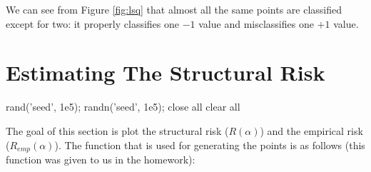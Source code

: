 \documentclass[11pt, twoside]{article}   	%
\newenvironment{matlab}{\comment}{\endcomment}
\begin{document}
We can see from Figure \ref{fig:lsq} that almost all the same points are 
classified except for two: it properly classifies one $-1$ value and 
misclassifies one $+1$ value. 

\section{Estimating The Structural Risk}
\begin{matlab}
rand('seed', 1e5);
randn('seed', 1e5);
close all 
clear all

\end{matlab}
The goal of this section is plot the structural risk ($R(\alpha)$) and 
the empirical risk ($R_{emp}(\alpha)$). The function that is used for
generating the points is as follows (this function was given to us 
in the homework): 


\end{document}
